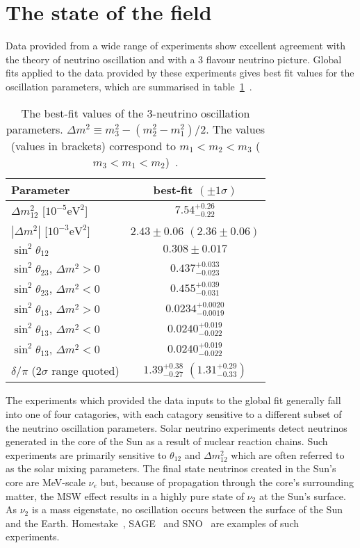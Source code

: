 \section{The state of the field}
\label{sec:StateOfTheField}
Data provided from a wide range of experiments show excellent agreement with the theory of neutrino oscillation and with a 3 flavour neutrino picture.  Global fits applied to the data provided by these experiments gives best fit values for the oscillation parameters, which are summarised in table~\ref{table:NeutrinoOscillationParameterValues}~\cite{Agashe:2014kda}.
\begin{table}
  \begin{tabular}{l c }
    Parameter & best-fit $(\pm1\sigma)$ \\ \hline \hline
    $\Delta m^2_{12}$ [$10^{-5}\textrm{eV}^2$] & $7.54^{+0.26}_{-0.22}$ \\
    $|\Delta m^2|$ [$10^{-3}\textrm{eV}^2$] & $2.43\pm0.06$ $(2.36\pm0.06)$ \\
    $\sin^2\theta_{12}$ & $0.308\pm0.017$ \\
    $\sin^2\theta_{23}$, $\Delta m^2 > 0$ & $0.437^{+0.033}_{-0.023}$ \\
    $\sin^2\theta_{23}$, $\Delta m^2 < 0$ & $0.455^{+0.039}_{-0.031}$ \\
    $\sin^2\theta_{13}$, $\Delta m^2 > 0$ & $0.0234^{+0.0020}_{-0.0019}$ \\
    $\sin^2\theta_{13}$, $\Delta m^2 < 0$ & $0.0240^{+0.019}_{-0.022}$ \\
    $\sin^2\theta_{13}$, $\Delta m^2 < 0$ & $0.0240^{+0.019}_{-0.022}$ \\
    $\delta/\pi$ ($2\sigma$ range quoted) & $1.39^{+0.38}_{-0.27}$ $(1.31^{+0.29}_{-0.33})$ \\
  \end{tabular}
  \caption{The best-fit values of the 3-neutrino oscillation parameters. $\Delta m^2 \equiv m^2_3 - \left(m^2_2 - m^2_1\right)/2$. The values (values in brackets) correspond to $m_1 < m_2 < m_3$ ($m_3 < m_1 < m_2$)~\cite{Agashe:2014kda}.}
  \label{table:NeutrinoOscillationParameterValues}
\end{table}
The experiments which provided the data inputs to the global fit generally fall into one of four catagories, with each catagory sensitive to a different subset of the neutrino oscillation parameters.
\newline
\newline
Solar neutrino experiments detect neutrinos generated in the core of the Sun as a result of nuclear reaction chains.  Such experiments are primarily sensitive to $\theta_{12}$ and $\Delta m^{2}_{12}$ which are often referred to as the solar mixing parameters.  The final state neutrinos created in the Sun's core are MeV-scale $\nu_e$ but, because of propagation through the core's surrounding matter, the MSW effect results in a highly pure state of $\nu_2$ at the Sun's surface.  As $\nu_2$ is a mass eigenstate, no oscillation occurs between the surface of the Sun and the Earth.  Homestake~\cite{0004-637X-496-1-505}, SAGE~\cite{PhysRevC.80.015807} and SNO~\cite{PhysRevLett.87.071301} are examples of such experiments.
